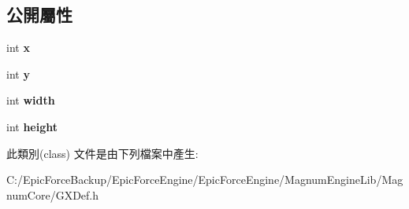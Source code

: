 \subsection*{公開屬性}
\begin{DoxyCompactItemize}
\item 
int {\bfseries x}\hypertarget{class_magnum_1_1_g_x_image_rect_a89337d50381571ffb80c2465ea628c08}{}\label{class_magnum_1_1_g_x_image_rect_a89337d50381571ffb80c2465ea628c08}

\item 
int {\bfseries y}\hypertarget{class_magnum_1_1_g_x_image_rect_af20580e76f6280f2f046acdab2871f4b}{}\label{class_magnum_1_1_g_x_image_rect_af20580e76f6280f2f046acdab2871f4b}

\item 
int {\bfseries width}\hypertarget{class_magnum_1_1_g_x_image_rect_aebd77060aa96c799c8fe1639f87181f7}{}\label{class_magnum_1_1_g_x_image_rect_aebd77060aa96c799c8fe1639f87181f7}

\item 
int {\bfseries height}\hypertarget{class_magnum_1_1_g_x_image_rect_abb9e8fb9fe5c69a10ec808f3426c558c}{}\label{class_magnum_1_1_g_x_image_rect_abb9e8fb9fe5c69a10ec808f3426c558c}

\end{DoxyCompactItemize}


此類別(class) 文件是由下列檔案中產生\+:\begin{DoxyCompactItemize}
\item 
C\+:/\+Epic\+Force\+Backup/\+Epic\+Force\+Engine/\+Epic\+Force\+Engine/\+Magnum\+Engine\+Lib/\+Magnum\+Core/G\+X\+Def.\+h\end{DoxyCompactItemize}
